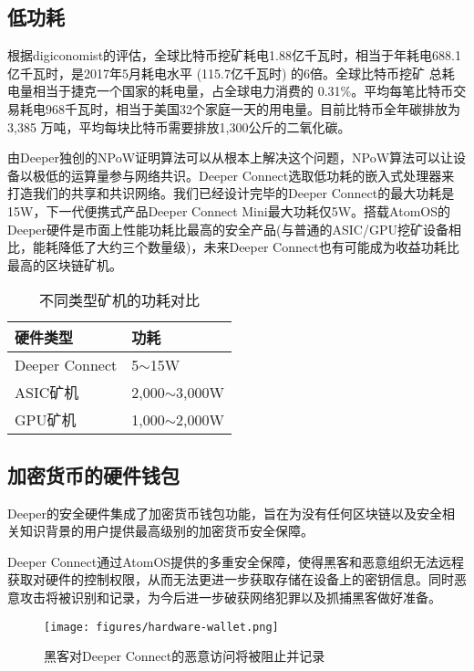 \documentclass[a4paper]{article}
\begin{document}
\subsection{低功耗}
根据digiconomist的评估\cite{bitcoin-energy-consumption}，全球比特币挖矿耗电1.88亿千瓦时，相当于年耗电688.1亿千瓦时，是2017年5月耗电水平 (115.7亿千瓦时) 的6倍。全球比特币挖矿
总耗电量相当于捷克一个国家的耗电量，占全球电力消费的 0.31\%。平均每笔比特币交易耗电968千瓦时，相当于美国32个家庭一天的用电量。目前比特币全年碳排放为3,385 万吨，平均每块比特币需要排放1,300公斤的二氧化碳\cite{bitcoin-energy-consumption2}。

由Deeper独创的NPoW证明算法可以从根本上解决这个问题，NPoW算法可以让设备以极低的运算量参与网络共识。Deeper Connect选取低功耗的嵌入式处理器来打造我们的共享和共识网络。我们已经设计完毕的Deeper Connect的最大功耗是15W，下一代便携式产品Deeper Connect Mini最大功耗仅5W。搭载AtomOS的Deeper硬件是市面上性能功耗比最高的安全产品(与普通的ASIC/GPU挖矿设备相比，能耗降低了大约三个数量级)，未来Deeper Connect也有可能成为收益功耗比最高的区块链矿机。

\begin{table} [hh]
\centering
\begin{tabular}{|l|l|}
\hline
硬件类型 & 功耗 \\ \hline
Deeper Connect & 5$\sim$15W \\ \hline
ASIC矿机 & 2,000$\sim$3,000W \\ \hline
GPU矿机 & 1,000$\sim$2,000W \\ \hline
\end{tabular}
\caption{不同类型矿机的功耗对比} 
\label{tab:power}
\end{table}

\subsection{加密货币的硬件钱包}
Deeper的安全硬件集成了加密货币钱包功能，旨在为没有任何区块链以及安全相关知识背景的用户提供最高级别的加密货币安全保障。

Deeper Connect通过AtomOS提供的多重安全保障，使得黑客和恶意组织无法远程获取对硬件的控制权限，从而无法更进一步获取存储在设备上的密钥信息。同时恶意攻击将被识别和记录，为今后进一步破获网络犯罪以及抓捕黑客做好准备。

\begin{figure}[hhhh]
\centering
\texttt{[image: figures/hardware-wallet.png]}
\caption{黑客对Deeper Connect的恶意访问将被阻止并记录}
\label{fig:hardware-wallet}
\end{figure}
\end{document}
